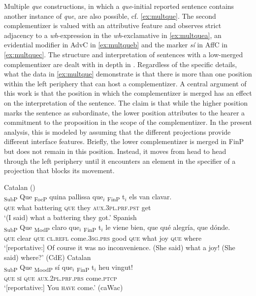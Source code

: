 Multiple \emph{que} constructions, in which a \emph{que}-initial reported sentence  contains another instance of \emph{que},  are also possible, cf. \eqref{ex:multque}. The second complementizer is valued with an attributive feature and  observes strict adjacency to a \textit{wh}-ex\-pres\-sion in the  \textit{wh}-exclamative in \eqref{ex:multquea}, an evidential modifier in AdvC in \eqref{ex:multqueb} and the  marker \emph{sí} in  AffC in \eqref{ex:multquec}. The structure and interpretation of sentences with a low-merged complementizer are dealt with in depth in . Regardless of the specific details, what the data in \eqref{ex:multque} demonstrate is that there is more than one position within the left periphery that can host a complementizer. A central argument of  this work is that the position in which the complementizer is merged has an effect on the interpretation of the sentence. The claim is that while the higher position marks the sentence as subordinate, the lower position attributes to the hearer a commitment to the proposition in the scope of the complementizer. In the present analysis, this is modeled by assuming that the different projections provide different interface features. Briefly,  the lower complementizer is merged in FinP but does not remain in this position. Instead, it moves from head to head through the left periphery until it encounters an element in the specifier of a projection that blocks its movement.




\ea\label{ex:multque}
\ea\label{ex:multquea}
Catalan  (\citealt[161: ex 26]{Corr2016})\\ 
\gll {\ob}\textsubscript{SubP} Que{\cb} {\ob}\textsubscript{FocP} quina pallissa que$_i${\cb} {\ob}\textsubscript{FinP} t$_i${\cb} els	van clavar. \\
{} \textsc{que} {} what	battering \textsc{que} {} {} they \textsc{aux.3pl.prf.pst} get\\
\glt `(I said) what a battering they got.'
\ex\label{ex:multqueb}Spanish\\\gll {\ob}\textsubscript{SubP} Que{\cb}  {\ob}\textsubscript{ModP} claro que$_i${\cb} {\ob}\textsubscript{FinP} t$_i${\cb} le viene bien, que qué alegría, que dónde. \\
{} \textsc{que} {} clear \textsc{que} {} {} \textsc{cl.refl} come.\textsc{3sg.prs} good \textsc{que} what joy \textsc{que} where \\
\glt `[reportative:] Of course it was no inconvenience. (She said) what a joy! (She said) where?' (CdE)
\ex\label{ex:multquec}
Catalan\\ 
\gll {\ob}\textsubscript{SubP} Que{\cb} {\ob}\textsubscript{MoodP} sí que$_i${\cb} {\ob}\textsubscript{FinP} t$_i${\cb} heu vingut!  \\
{} \textsc{que} {} \textsc{sí} \textsc{que} {} {} \textsc{aux.2pl.prf.prs} come.\textsc{ptcp}\\
\glt `[reportative:] You \textsc{have} come.' (caWac)
\z
\z

